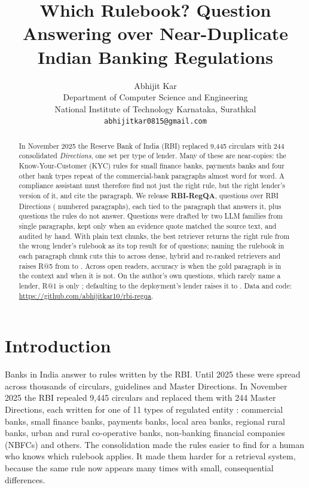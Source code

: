 \documentclass[11pt]{article}
\title{Which Rulebook? Question Answering over Near-Duplicate\\Indian Banking Regulations}
\author{Abhijit Kar \\
  Department of Computer Science and Engineering \\
  National Institute of Technology Karnataka, Surathkal \\
  \texttt{abhijitkar0815@gmail.com}}
\begin{document}
\maketitle

\begin{abstract}
In November 2025 the Reserve Bank of India (RBI) replaced 9,445 circulars with 244 consolidated \emph{Directions}, one set per type of lender. Many of these are near-copies: the Know-Your-Customer (KYC) rules for small finance banks, payments banks and four other bank types repeat \NearCopyBankRange{} of the commercial-bank paragraphs almost word for word. A compliance assistant must therefore find not just the right rule, but the right lender's version of it, and cite the paragraph. We release \textbf{RBI-RegQA}, \NQuestions{} questions over \NDocs{} RBI Directions (\NParas{} numbered paragraphs), each tied to the paragraph that answers it, plus \NUnans{} questions the rules do not answer. Questions were drafted by two LLM families from single paragraphs, kept only when an evidence quote matched the source text, and audited by hand. With plain text chunks, the best retriever returns the right rule from the wrong lender's rulebook as its top result for \FixedWL{} of questions; naming the rulebook in each paragraph chunk cuts this to \TitleWLRange{} across dense, hybrid and re-ranked retrievers and raises R@5 from \FixedRfive{} to \BestRfive{}. Across \NReaders{} open readers, accuracy is \RdGoldIn{} when the gold paragraph is in the context and \RdGoldOut{} when it is not. On the author's own questions, which rarely name a lender, R@1 is only \ExpertRone{}; defaulting to the deployment's lender raises it to \LAExpertRone{}. Data and code: \url{https://github.com/abhijitkar10/rbi-regqa}.
\end{abstract}

\section{Introduction}

Banks in India answer to rules written by the RBI. Until 2025 these were spread across thousands of circulars, guidelines and Master Directions. In November 2025 the RBI repealed 9,445 circulars and replaced them with 244 Master Directions, each written for one of 11 types of regulated entity \citep{rbi2025consolidation}: commercial banks, small finance banks, payments banks, local area banks, regional rural banks, urban and rural co-operative banks, non-banking financial companies (NBFCs) and others. The consolidation made the rules easier to find for a human who knows which rulebook applies. It made them harder for a retrieval system, because the same rule now appears many times with small, consequential differences.
\end{document}
